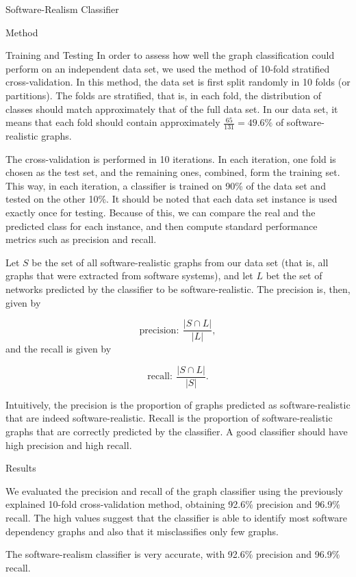 \documentclass[11pt,twocolumn,a4paper,english]{article}
\begin{document}
\begin{section}{Software-Realism Classifier}
\begin{subsection}{Method}
\begin{subsubsection}{Training and Testing}
	In order to assess how well the graph classification could perform on an independent data set, we used the method of 10-fold stratified cross-validation. In this method, the data set is first split randomly in 10 folds (or partitions). The folds are stratified, that is, in each fold, the distribution of classes should match approximately that of the full data set. In our data set, it means that each fold should contain approximately $\frac{65}{131} = 49.6\%$ of software-realistic graphs. 
	
	The cross-validation is performed in 10 iterations. In each iteration, one fold is chosen as the test set, and the remaining ones, combined, form the training set. This way, in each iteration, a classifier is trained on 90\% of the data set and tested on the other 10\%. It should be noted that each data set instance is used exactly once for testing. Because of this, we can compare the real and the predicted class for each instance, and then compute standard performance metrics such as precision and recall. 
	
	Let $S$ be the set of all software-realistic graphs from our data set (that is, all graphs that were extracted from software systems), and let $L$ bet the set of networks predicted by the classifier to be software-realistic. The precision is, then, given by
	
	$$
	\mathrm{precision}: ~\frac{|S \cap L|}{|L|},
	$$
and the recall is given by
	
	$$
	\mathrm{recall}: ~\frac{|S \cap L|}{|S|}.
	$$
	
	Intuitively, the precision is the proportion of graphs predicted as software-realistic that are indeed software-realistic. Recall is the proportion of software-realistic graphs that are correctly predicted by the classifier. A good classifier should have high precision and high recall.
	
\end{subsubsection}

\begin{subsubsection}{Results}
	
	We evaluated the precision and recall of the graph classifier using the previously explained 10-fold cross-validation method, obtaining 92.6\% precision and 96.9\% recall. The high values suggest that the classifier is able to identify most software dependency graphs and also that it misclassifies only few graphs.

\begin{framed}
The software-realism classifier is very accurate, with 92.6\% precision and 96.9\% recall.	
\end{framed}
	

\end{subsubsection}
\end{subsection}
\end{section}
\end{document}
